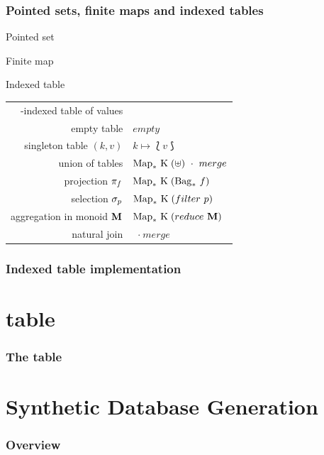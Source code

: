 \documentclass{beamer}
\begin{document}
\begin{frame}
\frametitle{Pointed sets, finite maps and indexed tables}
\begin{block}{Pointed set}
\end{block}
\begin{block}{Finite map}
\end{block}
\begin{block}{Indexed table}
\end{block}

\begin{table}[h]
    \centering
    \begin{tabular}{r|l}
        \keyset{}-indexed table of \valset{} values & \indexedTable{\keyset}{\valset} \\
        empty table & $empty$ \\
        singleton table $(k, v)$ & $k \mapsto \lbag v \rbag$ \\
        union of tables & $\finitemap{\keyset}{(\uplus)}\ \cdot\ merge$ \\
        projection $\pi_{f}$ & $\mathrm{Map}_*\ \mathrm{K}\;(\mathrm{Bag}_*\ f)$ \\
        selection $\sigma_{p}$ & $\mathrm{Map}_*\ \mathrm{K}\;(filter\ p)$ \\
        aggregation in monoid $\mathrm{\textbf{M}}$ & $\mathrm{Map}_*\ \mathrm{K}\;(reduce\
        \mathrm{\textbf{M}})$\\
            natural join & \finitemap{\keyset}{(\times)}\ $\cdot\ merge$ \\
    \end{tabular}
\end{table}
\end{frame}

\begin{frame}
    \frametitle{Indexed table implementation}
    
\end{frame}

\section{ table}
\begin{frame}
\frametitle{The  table}
\end{frame}

\section{Synthetic Database Generation}
\begin{frame}
\frametitle{Overview}
\end{frame}
\end{document}
